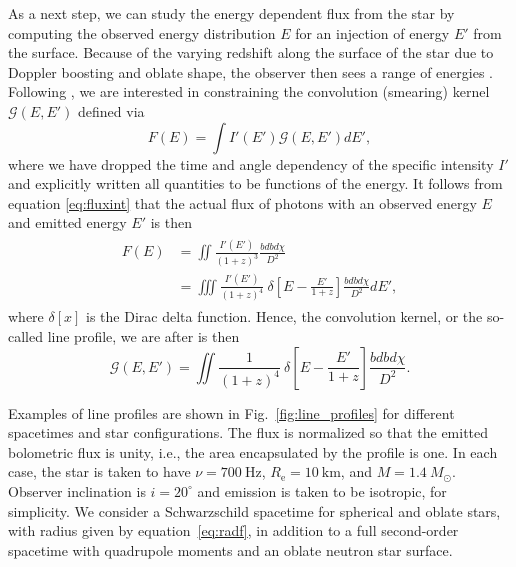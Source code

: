 \documentclass{aa}
\newcommand{\be}{\begin{equation}}
\newcommand{\ee}{\end{equation}}
\newcommand{\sch}{Schwarzschild }
\newcommand{\Msun}{\ensuremath{M_{\odot}}}
\begin{document}
As a next step, we can study the energy dependent flux from the star by computing the observed energy distribution $E$ for an injection of energy $E'$ from the surface.
Because of the varying redshift along the surface of the star due to Doppler boosting and oblate shape, the observer then sees a range of energies \citep{OP03,BML06,CMB06}.
Following \citealt{Baubock15}, we are interested in constraining the convolution (smearing) kernel $\mathcal{G}(E,E')$ defined via
\be
F(E) = \int I'(E') \mathcal{G}(E,E') dE',
\ee
where we have dropped the time and angle dependency of the specific intensity $I'$ and explicitly written all quantities to be functions of the energy.
It follows from equation \eqref{eq:fluxint} that the actual flux of photons with an observed energy $E$ and emitted energy $E'$ is then
\begin{align}\begin{split}
    F(E) &= \iint \frac{ I'(E') }{ (1+z)^3 } \frac{bdb d\chi}{D^2} \\
         &= \iiint \frac{I'(E') }{(1+z)^4} ~ \delta \left[ E - \frac{E'}{1+z} \right]  \frac{bdb d\chi}{D^2} dE',
\end{split}\end{align}
where $\delta[x]$ is the Dirac delta function.
Hence, the convolution kernel, or the so-called line profile, we are after is then 
\be
\mathcal{G}(E,E') =  \iint \frac{1}{(1+z)^4} ~\delta \left[E - \frac{E'}{1+z} \right]  \frac{bdb d\chi}{D^2}.
\ee


Examples of line profiles are shown in Fig.~\ref{fig:line_profiles} for different spacetimes and star configurations.
The flux is normalized so that the emitted bolometric flux is unity, i.e., the area encapsulated by the profile is one.
In each case, the star is taken to have $\nu = 700~\mathrm{Hz}$, $R_{\mathrm{e}} = 10~\mathrm{km}$, and $M=1.4~\Msun$.
Observer inclination is $i=20^{\circ}$ and emission is taken to be isotropic, for simplicity.
We consider a \sch spacetime for spherical and oblate stars, with radius given by equation~\eqref{eq:radf}, in addition to a full second-order spacetime with quadrupole moments and an oblate neutron star surface.
\end{document}
